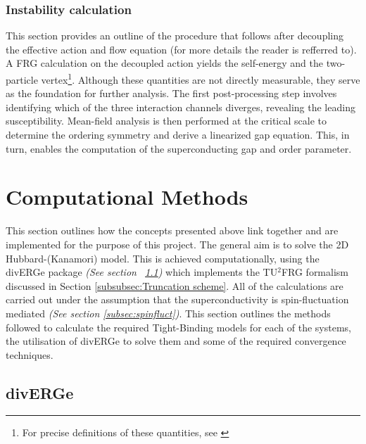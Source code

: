 \documentclass[12pt]{article}
\begin{document}
\medskip





\subsubsection{Instability calculation}

This section provides an outline of the procedure that follows after decoupling the effective action and flow equation (for more details the reader is refferred to\cite{profe2023functional}). 
A FRG calculation on the decoupled action yields the self-energy and the two-particle vertex\footnote{For precise definitions of these quantities, see \cite{metzner2012functional}}.
Although these quantities are not directly measurable, they serve as the foundation for further analysis. The first post-processing step involves
identifying which of the three interaction channels diverges, revealing the leading susceptibility. Mean-field analysis is then performed at the critical scale to determine the ordering symmetry 
and derive a linearized gap equation. This, in turn, enables the computation of 
the superconducting gap and order parameter.


\section{Computational Methods}

This section outlines how the concepts presented above link together and are implemented for the purpose of this project. 
The general aim is to solve the 2D Hubbard-(Kanamori) model. This is achieved computationally, using the divERGe package \textit{(See section ~\ref{subsec:diverge})} which implements the TU$^2$FRG
formalism discussed in Section \ref{subsubsec:Truncation scheme}. All of the calculations are carried out under the assumption that the superconductivity 
is spin-fluctuation mediated \textit{(See section \ref{subsec:spinfluct})}. This section outlines the methods followed to calculate the required Tight-Binding models for each of the systems, the utilisation of 
divERGe to solve them and some of the required convergence techniques. 


\subsection{divERGe}
\label{subsec:diverge}
\end{document}
